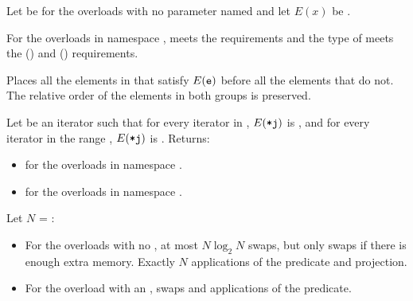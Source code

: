 \begin{itemdescr}
\pnum
Let  be 
for the overloads with no parameter named 
and let $E(x)$ be .

\pnum
\expects
For the overloads in namespace ,
 meets
the  requirements and
the type of  meets
the  () and
 () requirements.

\pnum
\effects
Places all the elements  in 
that satisfy $E(\texttt{\protect e})$ before all the elements that do not.
The relative order of the elements in both groups is preserved.

\pnum
\returns
Let  be an iterator
such that for every iterator  in ,
$E(\texttt{\protect*j})$ is ,
and for every iterator  in the range ,
$E(\texttt{\protect*j})$ is .
Returns:
\begin{itemize}
\item {} for the overloads in namespace .
\item {} for the overloads in namespace .
\end{itemize}

\pnum
\complexity
Let $N$ = :
\begin{itemize}
\item
  For the overloads with no , at most $N \log_2 N$ swaps,
  but only  swaps if there is enough extra memory.
  Exactly $N$ applications of the predicate and projection.
\item
  For the overload with an ,
   swaps and  applications of the predicate.
\end{itemize}
\end{itemdescr}

